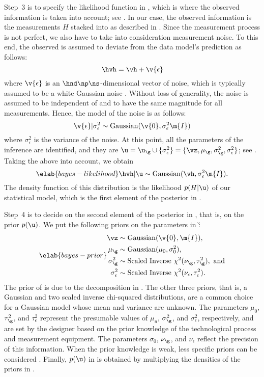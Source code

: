 Step~3 is to specify the likelihood function in , which is
where the observed information is taken into account; see
. In our case, the observed information is the
measurements $H$ stacked into \hvh as described in .
Since the measurement process is not perfect, we also have to take into
consideration measurement noise. To this end, the observed \hvh is assumed to
deviate from the data model's prediction \vh as follows:
\[
  \hvh = \vh + \v{\epsilon}
\]
where $\v{\epsilon}$ is an $\hnd \np \ns$-dimensional vector of noise, which is
typically assumed to be a white Gaussian noise \cite{rasmussen2006,
marzouk2009}. Without loss of generality, the noise is assumed to be independent
of \g and to have the same magnitude for all measurements. Hence, the model of
the noise is as follows:
\[
  \v{\epsilon} | \sigma^2_\epsilon \sim \mathrm{Gaussian}(\v{0}, \sigma^2_\epsilon \m{I})
\]
where $\sigma^2_\epsilon$ is the variance of the noise. At this point, all the
parameters of the inference are identified, and they are $\u = \u_\g \cup \{
\sigma_\epsilon^2 \} = \{ \vz, \mu_\g, \sigma_\g^2, \sigma_\epsilon^2 \}$; see
. Taking the above into account, we obtain
\begin{equation} \elab{bayes-likelihood}
  \hvh | \u \sim \mathrm{Gaussian}(\vh, \sigma_\epsilon^2 \m{I}).
\end{equation}
The density function of this distribution is the likelihood $p(H | \u)$ of our
statistical model, which is the first element of the posterior in
.

Step~4 is to decide on the second element of the posterior in
, that is, on the prior $p(\u)$. We put the following priors
on the parameters in \u:
\begin{align} \elab{bayes-prior}
  \begin{split}
    \vz               & \sim \mathrm{Gaussian}(\v{0}, \m{I}), \\
    \mu_\g            & \sim \mathrm{Gaussian}(\mu_0, \sigma^2_0), \\
    \sigma^2_\g       & \sim \mathrm{Scaled\ Inverse\ } \chi^2(\nu_\g, \tau^2_\g), \text{ and} \\
    \sigma^2_\epsilon & \sim \mathrm{Scaled\ Inverse\ } \chi^2(\nu_\epsilon, \tau^2_\epsilon).
  \end{split}
\end{align}
The prior of \vz is due to the decomposition in . The
other three priors, that is, a Gaussian and two scaled inverse chi-squared
distributions, are a common choice for a Gaussian model whose mean and variance
are unknown. The parameters $\mu_0$, $\tau^2_\g$, and $\tau^2_\epsilon$
represent the presumable values of $\mu_u$, $\sigma^2_\g$, and
$\sigma^2_\epsilon$, respectively, and are set by the designer based on the
prior knowledge of the technological process and measurement equipment. The
parameters $\sigma_0$, $\nu_\g$, and $\nu_\epsilon$ reflect the precision of
this information. When the prior knowledge is weak, less specific priors can be
considered \cite{gelman2013}. Finally, $p(\u)$ in  is
obtained by multiplying the densities of the priors in .

